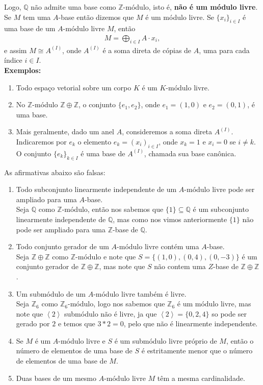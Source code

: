 \documentclass{article}
\begin{document}
Logo, $\mathbb{Q}$ não admite uma base como $\mathbb{Z}$-módulo, isto é, \textbf{não é um módulo livre}.\\

Se $M$ tem uma $A$-base então dizemos que $M$ é um módulo livre. Se $\{x_i\}_{i \in I}$ é uma base de um $A$-módulo livre $M$, então
\begin{align*}  
  M = \bigoplus_{i \in I} A \cdot x_i,
\end{align*}
e assim $M \cong A^{(I)}$, onde $A^{(I)}$ é a soma direta de cópias de $A$, uma para cada índice $i \in I$.\\

\textbf{Exemplos:}
\begin{enumerate}
    \item Todo espaço vetorial sobre um corpo $K$ é um $K$-módulo livre.
    \item No $\mathbb{Z}$-módulo $\mathbb{Z} \oplus \mathbb{Z}$, o conjunto $\{e_1, e_2\}$, onde $e_1 = (1,0)$ e $e_2 = (0,1)$, é uma base.
    \item Mais geralmente, dado um anel $A$, consideremos a soma direta $A^{(I)}$. Indicaremos por $e_k$ o elemento $e_k = (x_i)_{i \in I}$, onde $x_k = 1$ e $x_i = 0$ se $i \neq k$. O conjunto $\{e_k\}_{k \in I}$ é uma base de $A^{(I)}$, chamada sua base canônica.
\end{enumerate}
As afirmativas abaixo são falsas:
\begin{enumerate}
    \item Todo subconjunto linearmente independente de um $A$-módulo livre pode ser ampliado para uma $A$-base.\\
      Seja $\mathbb{Q}$ como $\mathbb{Z}$-módulo, então nos sabemos que $\{1\}\subseteq\mathbb{Q}$ é um subconjunto linearmente independente de $\mathbb{Q}$, mas como nos vimos anteriormente $\{1\}$ não pode ser ampliado para uma $\mathbb{Z}$-base de $\mathbb{Q}$. 
    \item Todo conjunto gerador de um $A$-módulo livre contém uma $A$-base.\\
      Seja $\mathbb{Z}\oplus \mathbb{Z}$ como $\mathbb{Z}$-módulo e note que $S=\{(1,0),(0,4),(0,-3)\}$ é um conjunto gerador de $\mathbb{Z}\oplus\mathbb{Z}$, mas note que $S$ não contem uma $Z$-base de $\mathbb{Z}\oplus\mathbb{Z}$. 
    \item Um submódulo de um $A$-módulo livre também é livre.\\
      Seja $\mathbb{Z}_{6}$ como $\mathbb{Z}_{6}$-módulo, logo nos sabemos que $\mathbb{Z}_{6}$ é um módulo livre, mas note que $\left\langle 2 \right\rangle$ submódulo não é livre, ja que $\left\langle 2 \right\rangle=\{0,2,4\}$ so pode ser gerado por $2$ e temos que $3*2=0$, pelo que não é linearmente independente. 
    \item Se $M$ é um $A$-módulo livre e $S$ é um submódulo livre próprio de $M$, então o número de elementos de uma base de $S$ é estritamente menor que o número de elementos de uma base de $M$.
    \item Duas bases de um mesmo $A$-módulo livre $M$ têm a mesma cardinalidade.
\end{enumerate}
\end{document}
